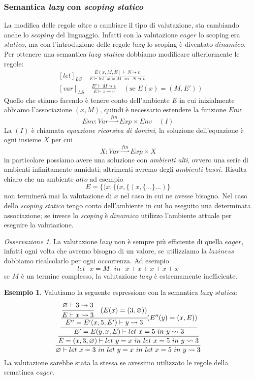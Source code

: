 \documentclass{article}
\theoremstyle{definition}
\theoremstyle{definition}
\theoremstyle{definition}
\newtheorem{example}[theorem]{Esempio}
\theoremstyle{remark}
\newtheorem{remark}[theorem]{Osservazione}
\begin{document}
\subsubsection{Semantica \textit{lazy} con \textit{scoping statico}}
La modifica delle regole oltre a cambiare il tipo
di valutazione, sta cambiando anche lo $scoping$ del linguaggio. Infatti con la valutazione $eager$ lo scoping era $statico$, ma con l'introduzione delle regole $lazy$ lo scoping è diventato $dinamico$.
Per ottenere una semantica $lazy$ $statica$ dobbiamo modificare ulteriormente le regole:
\begin{align*}
     & [let]_{LS} \quad\frac{E(x,M,E)\vdash N \leadsto v}{E\vdash \text{$let$ $x=M$ $in$ $N$}\leadsto v}    \\
     & [var]_{LS} \quad \frac{E'\vdash M \leadsto v}{E\vdash x \leadsto v}\quad (\text{se $E(x) = (M,E')$})
\end{align*}
Quello che stiamo facendo è tenere conto dell'ambiente $E$ in cui inizialmente abbiamo l'associazione  $(x,M)$, quindi è necessario
estendere la funzione $Env$:
$$Env: Var\overset{fin}{\rightharpoonup} Exp \times Env \quad(I)$$
La $(I)$ è chiamata \textit{equazione ricorsiva di domini}, la soluzione dell'equazione è ogni insieme $X$ per cui
$$X : Var\overset{fin}{\rightharpoonup} Exp \times X$$
in particolare possiamo avere una soluzione con \textit{ambienti alti}, ovvero una serie di ambienti infinitamente annidati; altrimenti avremo degli $ambienti$ $bassi$.
Risulta chiaro che un ambiente $alto$ ad esempio
$$E = \{(x,\{(x,\{(x,\{\dots\}\dots)\}$$
non terminerà mai la valutazione di $x$ nel caso in cui ne avesse bisogno.
Nel caso dello \textit{scoping statico} tengo conto dell'ambiente in cui ho eseguito una determinata associazione;
se invece lo \textit{scoping} è $dinamico$ utilizzo l'ambiente attuale per eseguire la valutazione.
\begin{remark}
    La valutazione $lazy$ non è sempre più efficiente di quella $eager$, infatti ogni volta che avremo bisogno di un valore, se utilizziamo la $laziness$ dobbiamo ricalcolarlo per ogni occorrenza. Ad esempio
    $$\text{$let$ $x = M$ $in$ $x+x+x+x+x$}$$
    se $M$ è un termine complesso, la valutazione $lazy$ è estremamente inefficiente.
\end{remark}
\begin{example}
    Valutiamo la seguente espressione con la semantica $lazy$ $statica$:
    $$\cfrac{\cfrac{\cfrac{\cfrac{\cfrac{\varnothing \vdash 3 \leadsto 3}
                    {E \vdash x \leadsto 3}\quad (E(x) = (3,\varnothing))}
                {E'' = E'(x,5,E')\vdash y \leadsto 3}(E''(y) = (x,E))}
                {E' = E(y,x,E)\vdash \text{$let$ $x=5$ $in$ $y$}\leadsto 3}}
            {E = (x,3,\varnothing)\vdash \text{$let$ $y= x$ $in$ $let$ $x=5$ $in$ $y$}\leadsto 3}}
        {\varnothing\vdash \text{$let$ $x=3$ $in$ $let$ $y= x$ $in$ $let$ $x=5$ $in$ $y$}\leadsto 3}$$
    La valutazione sarebbe stata la stessa se avessimo utilizzato le regole della sematinca $eager$.
\end{example}
\end{document}
